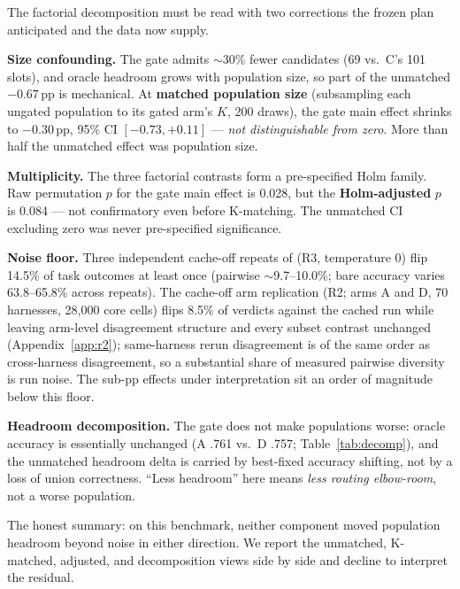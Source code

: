 The factorial decomposition must be read with two corrections the frozen plan
anticipated and the data now supply.

\textbf{Size confounding.} The gate admits $\sim$30\% fewer candidates (69 vs.\
C's 101 slots), and oracle headroom grows with population size, so part of the
unmatched $-0.67$\,pp is mechanical. At \textbf{matched population size}
(subsampling each ungated population to its gated arm's $K$, 200 draws), the gate
main effect shrinks to $-0.30$\,pp, 95\% CI $[-0.73, +0.11]$ --- \emph{not
distinguishable from zero}. More than half the unmatched effect was population
size.

\textbf{Multiplicity.} The three factorial contrasts form a pre-specified
Holm family. Raw permutation $p$ for the gate main effect is 0.028, but the
\textbf{Holm-adjusted} $p$ is 0.084 --- not confirmatory even before
K-matching. The unmatched CI excluding zero was never pre-specified
significance.

\textbf{Noise floor.} Three independent cache-off repeats of \bare{} (R3,
temperature 0) flip 14.5\% of task outcomes at least once (pairwise
$\sim$9.7--10.0\%; bare accuracy varies 63.8--65.8\% across repeats). The
cache-off arm replication (R2; arms A and D, 70 harnesses, 28{,}000 core
cells) flips 8.5\% of verdicts against the cached run while leaving
arm-level disagreement structure and every subset contrast unchanged
(Appendix~\ref{app:r2}); same-harness rerun disagreement is of the same
order as cross-harness disagreement, so a substantial share of measured
pairwise diversity is run noise. The sub-pp effects under interpretation
sit an order of magnitude below this floor.

\textbf{Headroom decomposition.} The gate does not make populations worse:
oracle accuracy is essentially unchanged (A .761 vs.\ D .757; Table~\ref{tab:decomp}),
and the unmatched headroom delta is carried by best-fixed accuracy shifting, not
by a loss of union correctness. ``Less headroom'' here means \emph{less routing
elbow-room}, not a worse population.

The honest summary: on this benchmark, neither component moved population headroom
beyond noise in either direction. We report the unmatched, K-matched, adjusted,
and decomposition views side by side and decline to interpret the residual.


